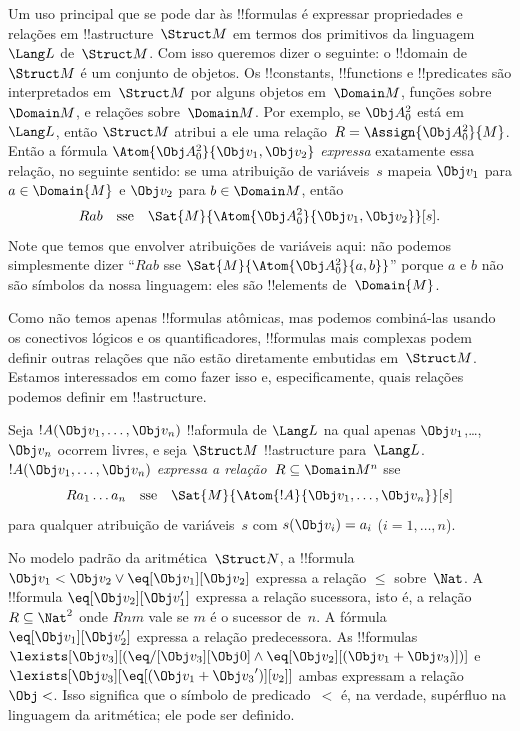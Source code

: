 \documentclass[../../../include/open-logic-section]{subfiles}
\begin{document}


\begin{explain}
Um uso principal que se pode dar às !!{formula}s é expressar propriedades e
relações em !!a{structure}~$\Struct M$ em termos dos primitivos da
linguagem~$\Lang L$ de~$\Struct M$.  Com isso queremos dizer o seguinte:
o !!{domain} de $\Struct M$ é um conjunto de objetos.  Os !!{constant}s,
!!{function}s e !!{predicate}s são interpretados em~$\Struct M$ por
alguns objetos em~$\Domain M$, funções sobre~$\Domain M$, e relações
sobre~$\Domain M$.  Por exemplo, se $\Obj A^2_0$ está em $\Lang L$, então
$\Struct M$ atribui a ele uma relação~$R = \Assign{{\Obj
  A^2_0}}{M}$. Então a fórmula $\Atom{\Obj A^2_0}{\Obj v_1, \Obj v_2}$
\emph{expressa} exatamente essa relação, no seguinte sentido: se uma
atribuição de variáveis~$s$ mapeia $\Obj v_1$ para $a \in \Domain{M}$ e
$\Obj v_2$ para $b \in \Domain M$, então
\[
Rab \text{\quad sse\quad} \Sat{M}{\Atom{\Obj A^2_0}{\Obj v_1, \Obj v_2}}[s].
\]
Note que temos que envolver atribuições de variáveis aqui: não podemos simplesmente
dizer ``$Rab$ sse $\Sat{M}{\Atom{\Obj A^2_0}{a, b}}$'' porque $a$ e
  $b$ não são símbolos da nossa linguagem: eles são !!{element}s
  de~$\Domain{M}$.

Como não temos apenas !!{formula}s atômicas, mas podemos combiná-las
usando os conectivos lógicos e os quantificadores, !!{formula}s mais complexas
podem definir outras relações que não estão diretamente embutidas
em~$\Struct M$.  Estamos interessados em como fazer isso e,
especificamente, quais relações podemos definir em !!a{structure}.
\end{explain}

\begin{defn}
Seja $!A(\Obj v_1,\dots, \Obj v_n)$ !!a{formula} de $\Lang L$ na
qual apenas $\Obj v_1$,\dots, $\Obj v_n$ ocorrem livres, e seja $\Struct
M$ !!a{structure} para~$\Lang L$. $!A(\Obj v_1,\dots, \Obj v_n)$
\emph{expressa a relação}~$R \subseteq \Domain M^n$ sse
\[
Ra_1\dots a_n \text{\quad sse\quad} \Sat{M}{\Atom{!A}{\Obj
    v_1,\dots, \Obj v_n}}[s]
\]
para qualquer atribuição de variáveis~$s$ com $s(\Obj v_i) = a_i$ ($i = 1,
\dots, n$).
\end{defn}

\begin{ex}
No modelo padrão da aritmética~$\Struct N$, a !!{formula} $\Obj
v_1 < \Obj v_2 \lor \eq[\Obj v_1][\Obj v_2]$ expressa a relação $\le$
sobre~$\Nat$. A !!{formula} $\eq[\Obj v_2][\Obj v_1']$
expressa a relação sucessora, isto é, a relação $R \subseteq
\Nat^2$ onde $Rnm$ vale se $m$ é o sucessor de~$n$. A fórmula
$\eq[\Obj v_1][\Obj v_2']$ expressa a relação predecessora.  As
!!{formula}s $\lexists[\Obj v_3][(\eq/[\Obj v_3][\Obj 0] \land
  \eq[\Obj v_2][(\Obj v_1 + \Obj v_3)])]$ e $\lexists[\Obj
  v_3][\eq[(\Obj v_1 + {\Obj v_3}')][v_2]]$ ambas expressam a relação $\Obj <$.
Isso significa que o símbolo de predicado~$<$ é, na verdade,
supérfluo na linguagem da aritmética; ele pode ser definido.
\end{ex}
\end{document}
